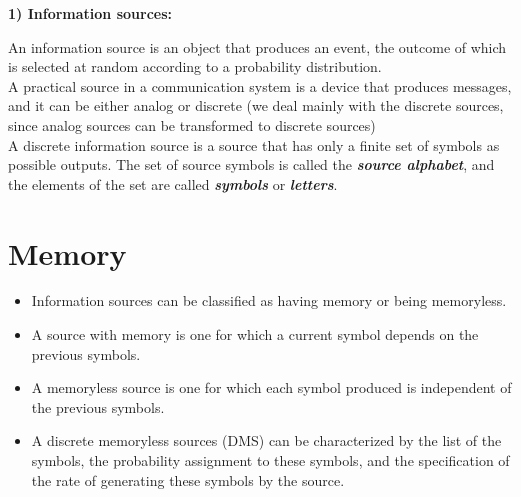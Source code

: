 \textbf{1) Information sources:}

An information source is an object that produces an event, the outcome of which is selected at
random according to a probability distribution.  \\ \bigskip A practical source in a communication system is a
device that produces messages, and it can be either analog or discrete (we deal mainly
with the discrete sources, since analog sources can be transformed to discrete sources) \\ \bigskip A discrete information source is a
source that has only a finite set of symbols as possible outputs. The set of source symbols is called the
\textbf{\emph{source alphabet}}, and the elements of the set are called \textbf{\emph{ symbols}} or \textbf{\emph{letters}}.


\section{Memory}
\begin{itemize} \item Information sources can be classified as having memory or being memoryless.
\item A source with
memory is one for which a current symbol depends on the previous symbols.\item A memoryless source is
one for which each symbol produced is independent of the previous symbols.

\item A discrete memoryless sources (DMS) can be characterized by the list of the symbols, the
probability assignment to these symbols, and the specification of the rate of generating these symbols by the source.\end{itemize}



